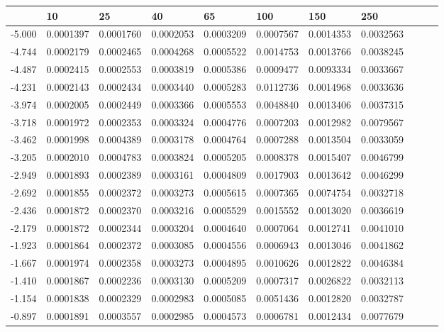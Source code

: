 \documentclass{article}
\begin{document}
\begin{table}[H]
\centering
\begin{adjustwidth}{-0.5in}{-.7in} 
\begin{tabular}{|l|l|l|l|l|l|l|l|l|l|l|}
\hline
& 10 & 25 & 40 & 65 & 100 & 150 & 250 \\ \hline
-5.000 & 0.0001397 & 0.0001760 & 0.0002053 & 0.0003209 & 0.0007567 & 0.0014353 & 0.0032563 \\ \hline
-4.744 & 0.0002179 & 0.0002465 & 0.0004268 & 0.0005522 & 0.0014753 & 0.0013766 & 0.0038245 \\ \hline
-4.487 & 0.0002415 & 0.0002553 & 0.0003819 & 0.0005386 & 0.0009477 & 0.0093334 & 0.0033667 \\ \hline
-4.231 & 0.0002143 & 0.0002434 & 0.0003440 & 0.0005283 & 0.0112736 & 0.0014968 & 0.0033636 \\ \hline
-3.974 & 0.0002005 & 0.0002449 & 0.0003366 & 0.0005553 & 0.0048840 & 0.0013406 & 0.0037315 \\ \hline
-3.718 & 0.0001972 & 0.0002353 & 0.0003324 & 0.0004776 & 0.0007203 & 0.0012982 & 0.0079567 \\ \hline
-3.462 & 0.0001998 & 0.0004389 & 0.0003178 & 0.0004764 & 0.0007288 & 0.0013504 & 0.0033059 \\ \hline
-3.205 & 0.0002010 & 0.0004783 & 0.0003824 & 0.0005205 & 0.0008378 & 0.0015407 & 0.0046799 \\ \hline
-2.949 & 0.0001893 & 0.0002389 & 0.0003161 & 0.0004809 & 0.0017903 & 0.0013642 & 0.0046299 \\ \hline
-2.692 & 0.0001855 & 0.0002372 & 0.0003273 & 0.0005615 & 0.0007365 & 0.0074754 & 0.0032718 \\ \hline
-2.436 & 0.0001872 & 0.0002370 & 0.0003216 & 0.0005529 & 0.0015552 & 0.0013020 & 0.0036619 \\ \hline
-2.179 & 0.0001872 & 0.0002344 & 0.0003204 & 0.0004640 & 0.0007064 & 0.0012741 & 0.0041010 \\ \hline
-1.923 & 0.0001864 & 0.0002372 & 0.0003085 & 0.0004556 & 0.0006943 & 0.0013046 & 0.0041862 \\ \hline
-1.667 & 0.0001974 & 0.0002358 & 0.0003273 & 0.0004895 & 0.0010626 & 0.0012822 & 0.0046384 \\ \hline
-1.410 & 0.0001867 & 0.0002236 & 0.0003130 & 0.0005209 & 0.0007317 & 0.0026822 & 0.0032113 \\ \hline
-1.154 & 0.0001838 & 0.0002329 & 0.0002983 & 0.0005085 & 0.0051436 & 0.0012820 & 0.0032787 \\ \hline
-0.897 & 0.0001891 & 0.0003557 & 0.0002985 & 0.0004573 & 0.0006781 & 0.0012434 & 0.0077679 \\ \hline

\end{tabular}
\end{adjustwidth}
\end{table}
\end{document}
